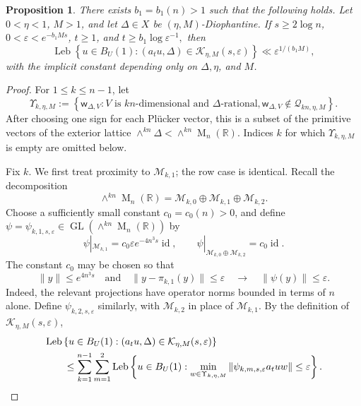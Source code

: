 \documentclass[reqno,11pt]{amsart}
\numberwithin{equation}{section}
\newtheorem{proposition}[theorem]{Proposition}
\theoremstyle{definition}
\theoremstyle{remark}
\newcommand{\op}{\operatorname}
\newcommand{\M}{\op{M}}
\newcommand{\id}{\op{id}}
\newcommand{\GL}{\op{GL}}
\begin{document}
\begin{proposition}\label{prop:avoidance0}
There exists $b_1=b_1(n)>1$ such that the following holds. Let
$0<\eta<1$, $M>1$, and let $\Delta\in X$ be
$(\eta,M)$-Diophantine. If
$s\ge 2\log n$, $0<\varepsilon<e^{-b_1Ms}$, $t\ge1$, and
$t\ge b_1\log \varepsilon^{-1},$
then
\begin{equation}\label{eq:avoidance0}
\operatorname{Leb}
\left\{u\in B_{U}(1):
(a_tu,\Delta)
\in\mathcal K_{\eta,M}(s,\varepsilon)
\right\}
\ll
\varepsilon^{1/(b_1M)},
\end{equation}
with the implicit constant depending only on
$\Delta,\eta$, and $M$.
\end{proposition}
\begin{proof}
For $1\le k\le n-1$, let
$$
\Upsilon_{k,\eta,M}
:=
\left\{
\mathsf w_{\Delta,V}:
V\text{ is $kn$-dimensional and $\Delta$-rational},
\mathsf w_{\Delta,V}\notin\mathscr Q_{kn,\eta,M}
\right\}.
$$
After choosing one sign for each Pl\"ucker vector, this is a subset of
the primitive vectors of the exterior lattice
$\wedge^{kn}\Delta<\wedge^{kn}\M_n(\mathbb R)$. Indices $k$ for which
$\Upsilon_{k,\eta,M}$ is empty are omitted below.

Fix $k$. We first treat proximity to $\mathcal M_{k,1}$; the row case
is identical. Recall the decomposition
$$
\wedge^{kn}\M_n(\mathbb R)
=
\mathcal M_{k,0}\oplus\mathcal M_{k,1}\oplus\mathcal M_{k,2}.
$$
Choose a sufficiently small constant $c_0=c_0(n)>0$, and define
$\psi=\psi_{k,1,s,\varepsilon}\in
\GL(\wedge^{kn}\M_n(\mathbb R))$ by
$$
\psi|_{\mathcal M_{k,1}}
=
c_0\varepsilon e^{-4n^3s}\id,
\qquad
\psi|_{\mathcal M_{k,0}\oplus\mathcal M_{k,2}}
=
c_0\id.
$$
The constant $c_0$ may be chosen so that
$$
\|y\|\le e^{4n^3s}
\quad\text{and}\quad
\|y-\pi_{k,1}(y)\|\le\varepsilon
\quad\to\quad
\|\psi(y)\|\le\varepsilon.
$$
Indeed, the relevant projections have operator norms bounded in terms
of $n$ alone. Define $\psi_{k,2,s,\varepsilon}$ similarly, with
$\mathcal M_{k,2}$ in place of $\mathcal M_{k,1}$. By the definition
of $\mathcal K_{\eta,M}(s,\varepsilon)$,
\begin{align}
&\operatorname{Leb}
\left\{u\in B_U(1):
(a_tu,\Delta)\in\mathcal K_{\eta,M}(s,\varepsilon)
\right\}
\notag\\
&\qquad\le
\sum_{k=1}^{n-1}\sum_{m=1}^2
\operatorname{Leb}
\left\{u\in B_U(1):
\min_{w\in\Upsilon_{k,\eta,M}}
\|\psi_{k,m,s,\varepsilon}a_tuw\|
\le\varepsilon
\right\}.
\label{eq:avoidance-union-selected}
\end{align}


\end{proof}
\end{document}

